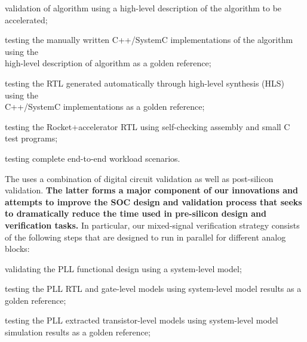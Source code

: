 \begin{cbxlist}{1.5em}{1em}{1em}
    \smallskip
    \begin{cbxlist}[--]{1.5em}{0em}{0em}
      \raggedright

      \item validation of algorithm using a high-level description of the
         algorithm to be accelerated;

      \item testing the manually written C++/SystemC implementations of
         the algorithm using the \\\hspace{0.5em}high-level description
         of algorithm as a golden reference;

      \item testing the RTL generated automatically through high-level
         synthesis (HLS) using the \\\hspace{0.5em}C++/SystemC
         implementations as a golden reference;

      \item testing the Rocket+accelerator RTL using self-checking
         assembly and small C test programs;

      \item testing complete end-to-end workload scenarios.

    \end{cbxlist}

 \item The  uses a combination of digital circuit validation as well as post-silicon validation. {\bf The latter forms a major component of our innovations and attempts to improve the SOC design and validation process that seeks to dramatically reduce the time used in pre-silicon design and verification tasks.} In particular, our mixed-signal verification strategy consists of the following steps that are designed to run in parallel for different analog blocks:

    \smallskip
    \begin{cbxlist}[--]{1.5em}{0em}{0em}
      \raggedright

      \item validating the PLL functional design using a system-level model;

      \item testing the PLL RTL and gate-level models using system-level
         model results as a golden reference;

      \item testing the PLL extracted transistor-level models using
         system-level model simulation results as a golden reference;


\end{cbxlist}
\end{cbxlist}
